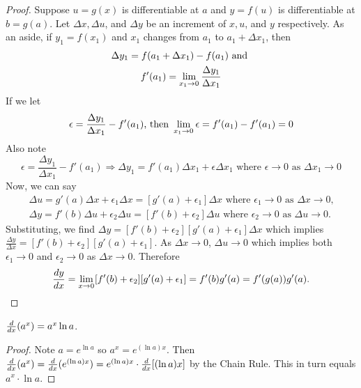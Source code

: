 \documentclass[a4paper,8pt]{article}
\begin{document}
\begin{outline}
    \begin{proof}
      Suppose \(u=g(x)\) is differentiable at \(a\) and \(y=f(u)\) is differentiable at \(b=g(a)\). Let
      \(\Delta x, \Delta u\), and \(\Delta y\) be an increment of \(x, u\), and \(y\) respectively. As an aside,
      if \(y_1=f(x_1)\) and \(x_1\) changes from \(a_1\) to \(a_1 + \Delta x_1\), then
      \begin{gather*}
        \Delta y_1 = f(a_1+\Delta x_1)-f(a_1)\text{ and }\\
        f'(a_1) = \xlimit{x_1}{0}\frac{\Delta y_1}{\Delta x_1}
      \end{gather*}
      If we let
      \[
        \epsilon = \frac{\Delta y_1}{\Delta x_1} - f'(a_1)\text{, then }
        \xlimit{x_1}{0}\epsilon = f'(a_1)-f'(a_1) = 0
      \]
      Also note
      \[
        \epsilon = \frac{\Delta y_1}{\Delta x_1} - f'(a_1) \Rightarrow \Delta y_1=f'(a_1)\Delta x_1 +
        \epsilon\Delta x_1\text{ where } \epsilon \rightarrow 0\text{ as }\Delta x_1 \rightarrow 0
      \]
      Now, we can say
      \begin{gather*}
        \Delta u=g'(a)\Delta x + \epsilon_1\Delta x = [g'(a)+\epsilon_1]\Delta x\text{ where } \epsilon_1
          \rightarrow 0\text{ as }\Delta x\rightarrow 0\text{,}\\
        \Delta y=f'(b)\Delta u + \epsilon_2\Delta u = [f'(b)+\epsilon_2]\Delta u\text{ where } \epsilon_2
          \rightarrow 0\text{ as }\Delta u\rightarrow 0\text{.}
      \end{gather*}
      Substituting, we find \(\Delta y=[f'(b)+\epsilon_2][g'(a)+\epsilon_1]\Delta x\) which implies
      \(\frac{\Delta y}{\Delta x} = [f'(b)+\epsilon_2][g'(a)+\epsilon_1]\). As \(\Delta x\rightarrow 0\),
      \(\Delta u\rightarrow 0\) which implies both \(\epsilon_1\rightarrow 0\) and \(\epsilon_2\rightarrow 0\)
      as \(\Delta x\rightarrow 0\).
      Therefore
      \[
        \leibniz[y]{x} = \xlimit{x}{0}[f'(b)+\epsilon_2][g'(a)+\epsilon_1] = f'(b)g'(a) = f'(g(a))g'(a)\text{.}
      \]
    \end{proof}

    \(\leibniz{x}(a^x) = a^x\ln{a}\).

    \begin{proof}
      Note \(a = e^{\ln{a}}\) so \(a^x = e^{(\ln{a})x}\). Then \(\leibniz{x}(a^x) = \leibniz{x}(e^{(\ln{a})x})
      = e^{(\ln{a})x} \cdot \leibniz{x}[(\ln{a})x]\) by the Chain Rule. This in turn equals \(a^x\cdot \ln{a}\).
    \end{proof}


\end{outline}
\end{document}
